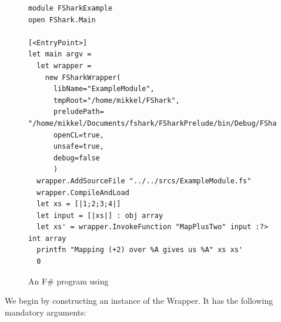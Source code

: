 \begin{figure}[h]
  \centering
    \begin{verbatim}
module FSharkExample
open FShark.Main

[<EntryPoint>]
let main argv =
  let wrapper = 
    new FSharkWrapper(
      libName="ExampleModule",
      tmpRoot="/home/mikkel/FShark",
      preludePath= "/home/mikkel/Documents/fshark/FSharkPrelude/bin/Debug/FSharkPrelude.dll",
      openCL=true,
      unsafe=true,
      debug=false
      )
  wrapper.AddSourceFile "../../srcs/ExampleModule.fs"
  wrapper.CompileAndLoad
  let xs = [|1;2;3;4|]
  let input = [|xs|] : obj array
  let xs' = wrapper.InvokeFunction "MapPlusTwo" input :?> int array
  printfn "Mapping (+2) over %A gives us %A" xs xs'
  0
    \end{verbatim}
  \caption{An F\# program using \fshark{}}
  \label{fig:fsharkusageexample}
\end{figure}

We begin by constructing an instance of the \fshark{}Wrapper. It has the following
mandatory arguments:

